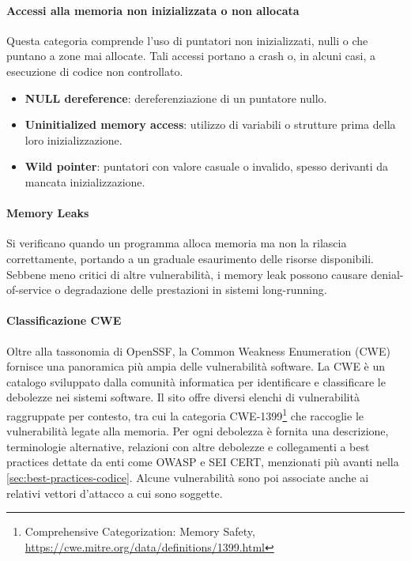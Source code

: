 \paragraph{Accessi alla memoria non inizializzata o non allocata}
\label{sec:invalid_access}

Questa categoria comprende l'uso di puntatori non inizializzati, nulli o che
puntano a zone mai allocate. Tali accessi portano a crash o, in alcuni casi, a esecuzione
di codice non controllato.

\begin{itemize}
  \item \textbf{NULL dereference}: dereferenziazione di un puntatore nullo.

  \item \textbf{Uninitialized memory access}: utilizzo di variabili o strutture prima
    della loro inizializzazione.

  \item \textbf{Wild pointer}: puntatori con valore casuale o invalido, spesso
    derivanti da mancata inizializzazione.
\end{itemize}

\paragraph{Memory Leaks}
\label{sec:memory_leaks} Si verificano quando un programma alloca memoria ma non
la rilascia correttamente, portando a un graduale esaurimento delle risorse
disponibili. Sebbene meno critici di altre vulnerabilità, i memory leak possono
causare denial-of-service o degradazione delle prestazioni in sistemi long-running.

\paragraph{Classificazione CWE}
Oltre alla tassonomia di OpenSSF, la Common Weakness Enumeration (CWE) fornisce
una panoramica più ampia delle vulnerabilità software. La CWE è un catalogo sviluppato
dalla comunità informatica per identificare e classificare le debolezze nei sistemi
software. Il sito offre diversi elenchi di vulnerabilità raggruppate per
contesto, tra cui la categoria CWE-1399\footnote{Comprehensive Categorization: Memory
Safety, \url{https://cwe.mitre.org/data/definitions/1399.html}} che raccoglie le
vulnerabilità legate alla memoria. Per ogni debolezza è fornita una descrizione,
terminologie alternative, relazioni con altre debolezze e collegamenti a best practices
dettate da enti come OWASP e SEI CERT, menzionati più avanti nella
\autoref{sec:best-practices-codice}. Alcune vulnerabilità sono poi associate anche
ai relativi vettori d'attacco a cui sono soggette.